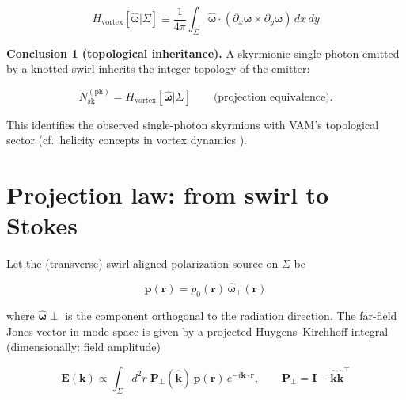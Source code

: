 \documentclass[12pt]{article}
\begin{document}
\begin{equation}

H_{\mathrm{vortex}}[\hat{\boldsymbol{\omega}}|\Sigma] \equiv
\frac{1}{4\pi}\int_{\Sigma}\hat{\boldsymbol{\omega}}\cdot
\left( \partial_x \hat{\boldsymbol{\omega}} \times \partial_y \hat{\boldsymbol{\omega}} \right) \, dx \, dy

\label{eq:Hvortex}

\end{equation}

\textbf{Conclusion 1 (topological inheritance).} A skyrmionic single-photon emitted by a knotted swirl inherits the integer topology of the emitter:

\begin{equation}

\boxed{N_{\mathrm{sk}}^{(\mathrm{ph})} = H_{\mathrm{vortex}}[\hat{\boldsymbol{\omega}}|\Sigma]}
\qquad\text{(projection equivalence).}

\label{eq:projection_equivalence}

\end{equation}

This identifies the observed single-photon skyrmions \cite{Ma2025NanoPhotonSkyrmions} with VAM’s topological sector (cf.\ helicity concepts in vortex dynamics \cite{Moffatt1969Helicity}).


\section{Projection law: from swirl to Stokes}

Let the (transverse) swirl-aligned polarization source on $\Sigma$ be

\begin{equation}

\mathbf{p}(\mathbf{r}) = p_0(\mathbf{r}) \, \hat{\boldsymbol{\omega}}_\perp(\mathbf{r})
\end{equation}

where $\hat{\boldsymbol{\omega}}\perp$ is the component orthogonal to the radiation direction. The far-field Jones vector in mode space is given by a projected Huygens–Kirchhoff integral (dimensionally: field amplitude)

\begin{equation}

\mathbf{E}(\mathbf{k}) \propto \int_{\Sigma} d^{2}r \; \mathbf{P}_\perp(\hat{\mathbf{k}}) \, \mathbf{p}(\mathbf{r}) \, e^{-i\mathbf{k}\cdot \mathbf{r}}, \qquad \mathbf{P}_\perp = \mathbf{I} - \hat{\mathbf{k}} \hat{\mathbf{k}}^\top
\label{eq:HK}
\end{equation}
\end{document}
